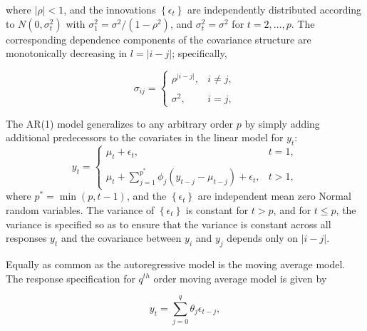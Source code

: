 \noindent 
where $\vert \rho \vert < 1$, and the innovations $\left\{\epsilon_t\right\}$ are independently distributed according to $N\left(0,\sigma_t^2\right)$ with $\sigma_1^2 = \sigma^2/\left(1-\rho^2\right)$, and $\sigma_t^2 = \sigma^2$ for $t = 2, \dots, p$. The corresponding dependence components of the covariance structure are monotonically decreasing in $l = \vert i-j \vert$; specifically,

\begin{equation}\label{eq:compound-symmetric-model}
\sigma_{ij} = \left\{ \begin{array}{lr}
\rho^{\vert i - j \vert}, & i \ne j,\\
& \\
\sigma^2, & i = j, 
\end{array}\right.
\end{equation}

\noindent
The AR(1) model generalizes to any arbitrary order $p$ by simply adding additional predecessors to the covariates in the linear model for $y_t$:
\begin{equation*}
y_{t} = \left\{ \begin{array}{lr}
\mu_t + \epsilon_t, & t = 1,\\
& \\
\mu_t + \sum\limits_{j = 1}^{p^*} \phi_j\left(y_{t-j} - \mu_{t-j}\right) + \epsilon_t, & t > 1,
\end{array}\right.
\end{equation*}
\noindent
where $p^* = \min\left(p,t-1\right)$, and the $\left\{\epsilon_t\right\}$ are independent mean zero Normal random variables. The variance of $\left\{\epsilon_t\right\}$ is constant for $t > p$, and for $t \le p$, the variance is specified so as to ensure that the variance is constant across all responses $y_t$ and the covariance between $y_i$ and $y_j$ depends only on $\vert i - j\vert$. 

\bigskip

Equally as common as the autoregressive model is the moving average model. The response specification for $q^{th}$ order moving average model  is given by 

\begin{equation}\label{eq:ma-q-model}
y_{t} = \sum_{j = 0}^{q} \theta_j \epsilon_{t-j},
\end{equation}

